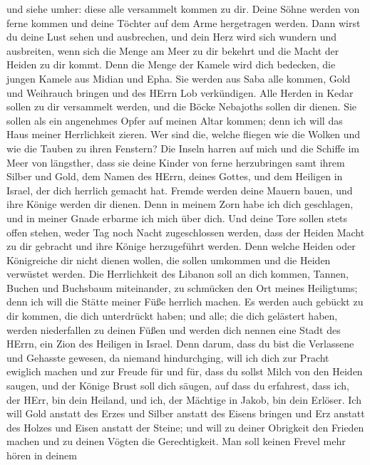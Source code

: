 und siehe umher: diese alle versammelt kommen zu dir. Deine Söhne werden
von ferne kommen und deine Töchter auf dem Arme hergetragen werden.
 Dann wirst du deine Lust sehen und ausbrechen, und dein
Herz wird sich wundern und ausbreiten, wenn sich die Menge am Meer zu
dir bekehrt und die Macht der Heiden zu dir kommt.  Denn die
Menge der Kamele wird dich bedecken, die jungen Kamele aus Midian und
Epha. Sie werden aus Saba alle kommen, Gold und Weihrauch bringen und
des HErrn Lob verkündigen.  Alle Herden in Kedar sollen zu
dir versammelt werden, und die Böcke Nebajoths sollen dir dienen. Sie
sollen als ein angenehmes Opfer auf meinen Altar kommen; denn ich will
das Haus meiner Herrlichkeit zieren.  Wer sind die, welche
fliegen wie die Wolken und wie die Tauben zu ihren Fenstern?
 Die Inseln harren auf mich und die Schiffe im Meer von
längsther, dass sie deine Kinder von ferne herzubringen samt ihrem
Silber und Gold, dem Namen des HErrn, deines Gottes, und dem Heiligen in
Israel, der dich herrlich gemacht hat.  Fremde werden deine
Mauern bauen, und ihre Könige werden dir dienen. Denn in meinem Zorn
habe ich dich geschlagen, und in meiner Gnade erbarme ich mich über
dich.  Und deine Tore sollen stets offen stehen, weder Tag
noch Nacht zugeschlossen werden, dass der Heiden Macht zu dir gebracht
und ihre Könige herzugeführt werden.  Denn welche Heiden
oder Königreiche dir nicht dienen wollen, die sollen umkommen und die
Heiden verwüstet werden.  Die Herrlichkeit des Libanon soll
an dich kommen, Tannen, Buchen und Buchsbaum miteinander, zu schmücken
den Ort meines Heiligtums; denn ich will die Stätte meiner Füße herrlich
machen.  Es werden auch gebückt zu dir kommen, die dich
unterdrückt haben; und alle; die dich gelästert haben, werden
niederfallen zu deinen Füßen und werden dich nennen eine Stadt des
HErrn, ein Zion des Heiligen in Israel.  Denn darum, dass
du bist die Verlassene und Gehasste gewesen, da niemand hindurchging,
will ich dich zur Pracht ewiglich machen und zur Freude für und für,
 dass du sollst Milch von den Heiden saugen, und der Könige
Brust soll dich säugen, auf dass du erfahrest, dass ich, der HErr, bin
dein Heiland, und ich, der Mächtige in Jakob, bin dein Erlöser.
 Ich will Gold anstatt des Erzes und Silber anstatt des
Eisens bringen und Erz anstatt des Holzes und Eisen anstatt der Steine;
und will zu deiner Obrigkeit den Frieden machen und zu deinen Vögten die
Gerechtigkeit.  Man soll keinen Frevel mehr hören in deinem
